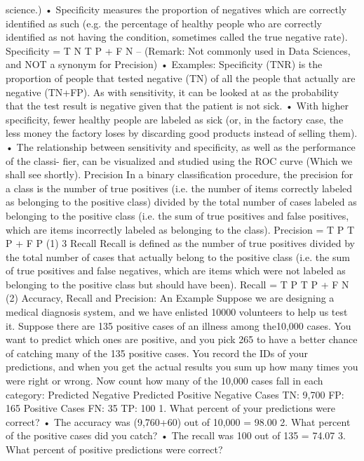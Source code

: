 \documentclass[a4paper,12pt]{article}
\begin{document}
science.)
• Specificity measures the proportion of negatives which are correctly identified as such (e.g.
the percentage of healthy people who are correctly identified as not having the condition,
sometimes called the true negative rate).
Specificity = T N
T P + F N
– (Remark: Not commonly used in Data Sciences, and NOT a synonym for Precision)
• Examples: Specificity (TNR) is the proportion of people that tested negative (TN) of all
the people that actually are negative (TN+FP). As with sensitivity, it can be looked at as
the probability that the test result is negative given that the patient is not sick.
• With higher specificity, fewer healthy people are labeled as sick (or, in the factory case, the
less money the factory loses by discarding good products instead of selling them).
• The relationship between sensitivity and specificity, as well as the performance of the classi-
fier, can be visualized and studied using the ROC curve (Which we shall see shortly).
Precision
In a binary classification procedure, the precision for a class is the number of true positives (i.e. the
number of items correctly labeled as belonging to the positive class) divided by the total number
of cases labeled as belonging to the positive class (i.e. the sum of true positives and false positives,
which are items incorrectly labeled as belonging to the class).
Precision = T P
T P + F P
(1)
3
Recall
Recall is defined as the number of true positives divided by the total number of cases that actually
belong to the positive class (i.e. the sum of true positives and false negatives, which are items
which were not labeled as belonging to the positive class but should have been).
Recall = T P
T P + F N
(2)
Accuracy, Recall and Precision: An Example
Suppose we are designing a medical diagnosis system, and we have enlisted 10000 volunteers to
help us test it. Suppose there are 135 positive cases of an illness among the10,000 cases. You want
to predict which ones are positive, and you pick 265 to have a better chance of catching many of
the 135 positive cases. You record the IDs of your predictions, and when you get the actual results
you sum up how many times you were right or wrong.
Now count how many of the 10,000 cases fall in each category:
Predicted Negative Predicted Positive
Negative Cases TN: 9,700 FP: 165
Positive Cases FN: 35 TP: 100
1. What percent of your predictions were correct?
• The accuracy was (9,760+60) out of 10,000 = 98.00%
2. What percent of the positive cases did you catch?
• The recall was 100 out of 135 = 74.07%
3. What percent of positive predictions were correct?
\end{document}
